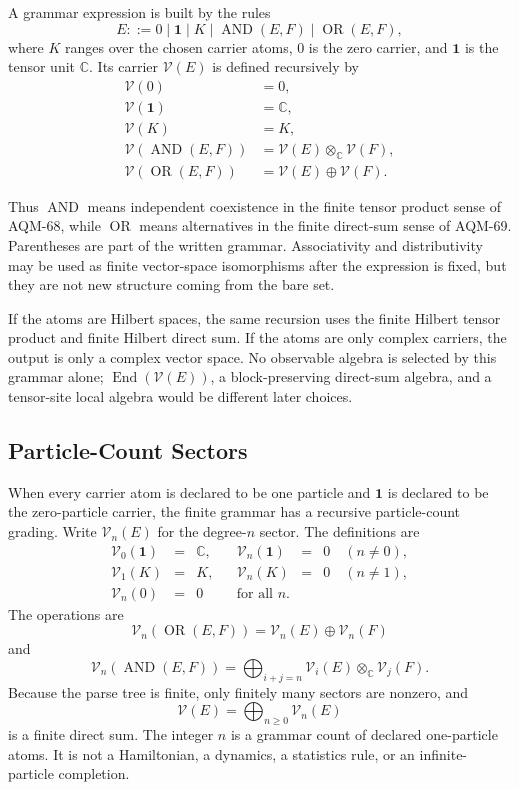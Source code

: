 A grammar expression is built by the rules
\[
  E ::= 0 \mid \mathbf 1 \mid K \mid
        \operatorname{AND}(E,F) \mid \operatorname{OR}(E,F),
\]
where \(K\) ranges over the chosen carrier atoms, \(0\) is the zero carrier,
and \(\mathbf 1\) is the tensor unit \(\mathbb C\).  Its carrier
\(\mathcal V(E)\) is defined recursively by
\[
\begin{aligned}
  \mathcal V(0)&=0,\\
  \mathcal V(\mathbf 1)&=\mathbb C,\\
  \mathcal V(K)&=K,\\
  \mathcal V(\operatorname{AND}(E,F))
    &=\mathcal V(E)\otimes_{\mathbb C}\mathcal V(F),\\
  \mathcal V(\operatorname{OR}(E,F))
    &=\mathcal V(E)\oplus\mathcal V(F).
\end{aligned}
\]

Thus \(\operatorname{AND}\) means independent coexistence in the finite tensor
product sense of AQM-68, while \(\operatorname{OR}\) means alternatives in the
finite direct-sum sense of AQM-69.  Parentheses are part of the written
grammar.  Associativity and distributivity may be used as finite vector-space
isomorphisms after the expression is fixed, but they are not new structure
coming from the bare set.

If the atoms are Hilbert spaces, the same recursion uses the finite Hilbert
tensor product and finite Hilbert direct sum.  If the atoms are only complex
carriers, the output is only a complex vector space.  No observable algebra is
selected by this grammar alone; \(\operatorname{End}(\mathcal V(E))\), a
block-preserving direct-sum algebra, and a tensor-site local algebra would be
different later choices.

\subsection{Particle-Count Sectors}

When every carrier atom is declared to be one particle and \(\mathbf 1\) is
declared to be the zero-particle carrier, the finite grammar has a recursive
particle-count grading.  Write \(\mathcal V_n(E)\) for the degree-\(n\)
sector.  The definitions are
\[
\begin{array}{rclcrcl}
  \mathcal V_0(\mathbf 1)&=&\mathbb C, &&
  \mathcal V_n(\mathbf 1)&=&0 \quad(n\neq0),\\
  \mathcal V_1(K)&=&K, &&
  \mathcal V_n(K)&=&0 \quad(n\neq1),\\
  \mathcal V_n(0)&=&0 &&
  \text{for all }n.
\end{array}
\]
The operations are
\[
  \mathcal V_n(\operatorname{OR}(E,F))
  =
  \mathcal V_n(E)\oplus\mathcal V_n(F)
\]
and
\[
  \mathcal V_n(\operatorname{AND}(E,F))
  =
  \bigoplus_{i+j=n}\mathcal V_i(E)\otimes_{\mathbb C}\mathcal V_j(F).
\]
Because the parse tree is finite, only finitely many sectors are nonzero, and
\[
  \mathcal V(E)=\bigoplus_{n\geq0}\mathcal V_n(E)
\]
is a finite direct sum.  The integer \(n\) is a grammar count of declared
one-particle atoms.  It is not a Hamiltonian, a dynamics, a statistics rule,
or an infinite-particle completion.

